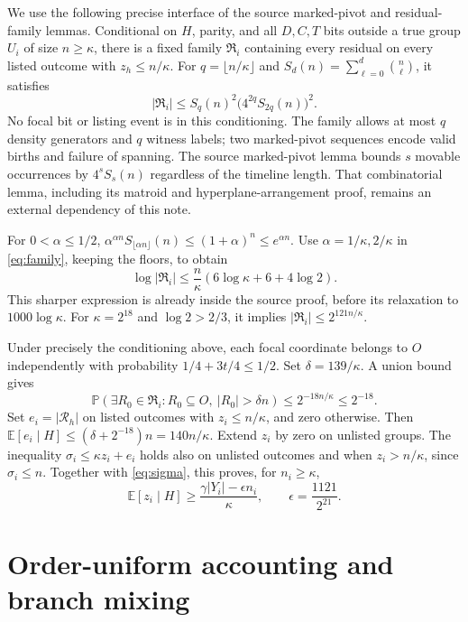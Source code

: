 \documentclass[11pt]{article}
\newcommand{\E}{\mathbb E}
\newcommand{\Prb}{\mathbb P}
\begin{document}
We use the following precise interface of the source marked-pivot
and residual-family lemmas. Conditional on $H$, parity, and all
$D,C,T$ bits outside a true group $U_i$ of size $n\ge\kappa$, there
is a fixed family $\mathfrak R_i$ containing every residual on every
listed outcome with $z_h\le n/\kappa$. For
$q=\lfloor n/\kappa\rfloor$ and
$S_d(n)=\sum_{\ell=0}^d\binom n\ell$, it satisfies
\begin{equation}\label{eq:family}
 |\mathfrak R_i|\le S_q(n)^2\bigl(4^{2q}S_{2q}(n)\bigr)^2.
\end{equation}
No focal bit or listing event is in this conditioning. The family
allows at most $q$ density generators and $q$ witness labels; two
marked-pivot sequences encode valid births and failure of spanning.
The source marked-pivot lemma bounds $s$ movable occurrences by
$4^sS_s(n)$ regardless of the timeline length. That combinatorial
lemma, including its matroid and hyperplane-arrangement proof, remains
an external dependency of this note.

For $0<\alpha\le1/2$,
$\alpha^{\alpha n}S_{\lfloor\alpha n\rfloor}(n)
\le(1+\alpha)^n\le e^{\alpha n}$.
Use $\alpha=1/\kappa,2/\kappa$ in \eqref{eq:family}, keeping the
floors, to obtain
\[
 \log|\mathfrak R_i|\le\frac n\kappa
       (6\log\kappa+6+4\log2).
\]
This sharper expression is already inside the source proof, before
its relaxation to $1000\log\kappa$. For $\kappa=2^{18}$ and
$\log2>2/3$, it implies
$|\mathfrak R_i|\le2^{121n/\kappa}$.

Under precisely the conditioning above, each focal coordinate belongs
to $O$ independently with probability $1/4+3t/4\le1/2$.
Set $\delta=139/\kappa$. A union bound gives
\[
 \Prb(\exists R_0\in\mathfrak R_i:
 R_0\subseteq O,\ |R_0|>\delta n)
 \le2^{-18n/\kappa}\le2^{-18}.
\]
Set $e_i=|\mathcal R_h|$ on listed outcomes with $z_i\le n/\kappa$,
and zero otherwise. Then
$\E[e_i\mid H]\le(\delta+2^{-18})n=140n/\kappa$.
Extend $z_i$ by zero on unlisted groups. The inequality
$\sigma_i\le\kappa z_i+e_i$ holds also on unlisted outcomes and
when $z_i>n/\kappa$, since $\sigma_i\le n$.
Together with \eqref{eq:sigma}, this proves, for $n_i\ge\kappa$,
\begin{equation}\label{eq:z}
 \E[z_i\mid H]\ge\frac{\gamma|Y_i|-\epsilon n_i}{\kappa},
 \qquad\epsilon=\frac{1121}{2^{21}}.
\end{equation}

\section{Order-uniform accounting and branch mixing}
\end{document}
